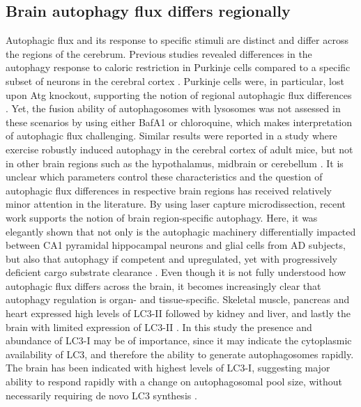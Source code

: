 \subsection{Brain autophagy flux differs regionally}
Autophagic flux and its response to specific stimuli are distinct and differ across the regions of the cerebrum. Previous studies revealed differences in the autophagy response to caloric restriction in Purkinje cells compared to a specific subset of neurons in the cerebral cortex \citep{Alirezaei2010}. Purkinje cells were, in particular, lost upon Atg knockout, supporting the notion of regional autophagic flux differences \citep{Alirezaei2010,Hara2006,Komatsu2006}. Yet, the fusion ability of autophagosomes with lysosomes was not assessed in these scenarios by using either BafA1 or chloroquine, which makes interpretation of autophagic flux challenging. Similar results were reported in a study where exercise robustly induced autophagy in the cerebral cortex of adult mice, but not in other brain regions such as the hypothalamus, midbrain or cerebellum \citep{He2012}. It is unclear which parameters control these characteristics and the question of autophagic flux differences in respective brain regions has received relatively minor attention in the literature. By using laser capture microdissection, recent work supports the notion of brain region-specific autophagy. Here, it was elegantly shown that not only is the autophagic machinery differentially impacted between CA1 pyramidal hippocampal neurons and glial cells from AD subjects, but also that autophagy if competent and upregulated, yet with progressively deficient cargo substrate clearance \citep{Bordi2016}. Even though it is not fully understood how autophagic flux differs across the brain, it becomes increasingly clear that autophagy regulation is organ- and tissue-specific. Skeletal muscle, pancreas and heart expressed high levels of LC3-II followed by kidney and liver, and lastly the brain with limited expression of LC3-II \citep{Mizushima2004a}. In this study the presence and abundance of LC3-I may be of importance, since it may indicate the cytoplasmic availability of LC3, and therefore the ability to generate autophagosomes rapidly. The brain has been indicated with highest levels of LC3-I, suggesting major ability to respond rapidly with a change on autophagosomal pool size, without necessarily requiring de novo LC3 synthesis \citep{Mizushima2004a}.

